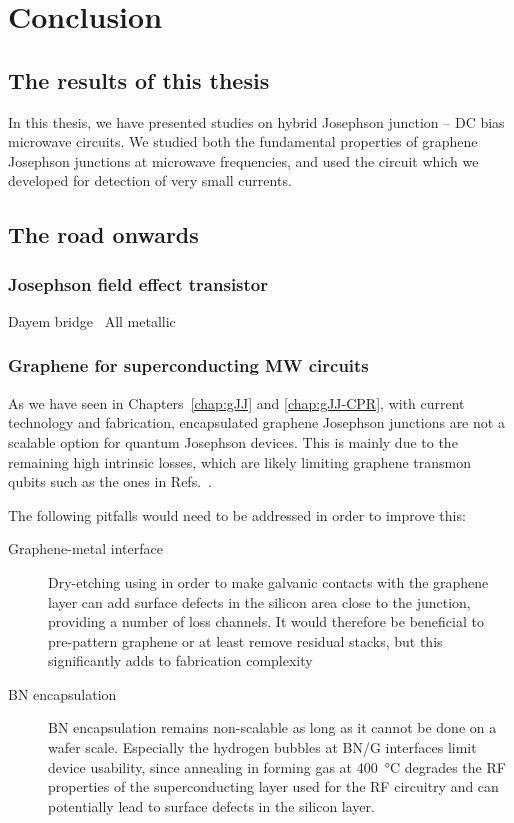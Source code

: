 \newchapstyle
\chapter{Conclusion}
\label{chap:conclusion}

\afterpage{\pagecolor{none}}\newpage

\section{The results of this thesis}
In this thesis, we have presented studies on hybrid Josephson junction -- DC bias microwave circuits.
%
We studied both the fundamental properties of graphene Josephson junctions at microwave frequencies, and used the circuit which we developed for detection of very small currents.

\section{The road onwards}

\subsection{Josephson field effect transistor}

Dayem bridge~\cite{paolucciMagnetotransportExperimentsFully2019}
All metallic~\cite{desimoniMetallicSupercurrentFieldeffect2018}
\subsection{Graphene for superconducting MW circuits}

As we have seen in Chapters~\ref{chap:gJJ} and \ref{chap:gJJ-CPR}, with current technology and fabrication, encapsulated graphene Josephson junctions are not a scalable option for quantum Josephson devices.
%
This is mainly due to the remaining high intrinsic losses, which are likely limiting graphene transmon qubits such as the ones in Refs.~\cite{krollMagneticFieldCompatible2018,wangCoherentControlHybrid2019}.

The following pitfalls would need to be addressed in order to improve this:
\begin{description}
	\item[Graphene-metal interface] Dry-etching using  in order to make galvanic contacts with the graphene layer can add surface defects in the silicon area close to the junction, providing a number of loss channels.
	It would therefore be beneficial to pre-pattern graphene or at least remove residual stacks, but this significantly adds to fabrication complexity
	\item[BN encapsulation] BN encapsulation remains non-scalable as long as it cannot be done on a wafer scale.
	Especially the hydrogen bubbles at BN/G interfaces limit device usability, since annealing in forming gas at \SI{400}{\celsius} degrades the RF properties of the superconducting layer used for the RF circuitry and can potentially lead to surface defects in the silicon layer.
\end{description}

